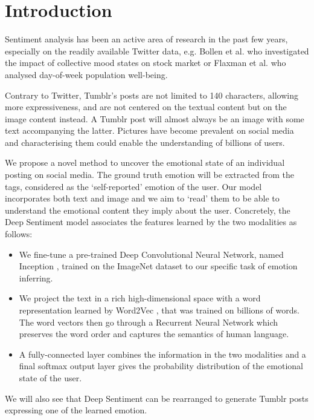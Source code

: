 \chapter{Introduction}

Sentiment analysis has been an active area of research in the past few years, especially on the readily available Twitter data, e.g. Bollen et al. \cite{bollen} who investigated the impact of collective mood states on stock market or Flaxman et al. \cite{seth-twitter} who analysed day-of-week population well-being.

Contrary to Twitter, Tumblr's posts are not limited to 140 characters, allowing more expressiveness, and are not centered on the textual content but on the image content instead. A Tumblr post will almost always be an image with some text accompanying the latter. Pictures have become prevalent on social media and characterising them could enable the understanding of billions of users. 

We propose a novel method to uncover the emotional state of an individual posting on social media. The ground truth emotion will be extracted from the tags, considered as the `self-reported' emotion of the user. Our model incorporates both text and image and we aim to `read' them to be able to understand the emotional content they imply about the user. Concretely, the Deep Sentiment model associates the features learned by the two modalities as follows:

\begin{itemize}
    \item We fine-tune a pre-trained Deep Convolutional Neural Network, named Inception \cite{googlenet}, trained on the ImageNet dataset to our specific task of emotion inferring.
    \item We project the text in a rich high-dimensional space with a word representation learned by Word2Vec \cite{word2vec}, that was trained on billions of words. The word vectors then go through a Recurrent Neural Network which preserves the word order and captures the semantics of human language.
    \item A fully-connected layer combines the information in the two modalities and a final softmax output layer gives the probability distribution of the emotional state of the user.
\end{itemize}

We will also see that Deep Sentiment can be rearranged to generate Tumblr posts expressing one of the learned emotion.









